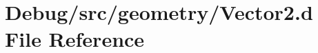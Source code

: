 \hypertarget{_vector2_8d}{}\section{Debug/src/geometry/\+Vector2.d File Reference}
\label{_vector2_8d}
